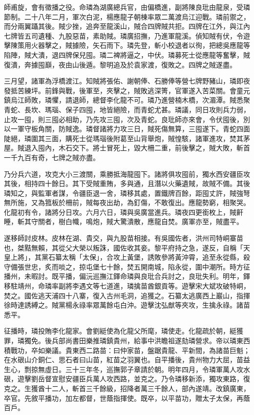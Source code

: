 \begin{pinyinscope}
師甫旋，會有徵播之役。命璘為湖廣總兵官，由偏橋進，副將陳良玭由龍泉，受璘節制。二十八年二月，軍次白泥，楊應龍子朝棟率眾二萬渡烏江迎戰。璘前禦之，而分兩翼躡其後。賊少挫，追奔至龍溪山，賊合四牌賊共拒。四牌在江外，與江內七牌皆五司遺種、九股惡苗，素助賊。璘廣招撫，乃進軍龍溪。偵知賊有伏，令遊擊陳策用火器擊之，賊據險，矢石雨下。璘先登，斬小校退者以徇，把總吳應龍等陷陣，賊大潰，退四牌保兒囤。璘二裨將逼之，中伏。璘募死士從應龍等奮擊，賊復潰，奔據囤巔，夜由山後遁。黎明追及於袁家渡，復敗之。四牌之賊遂盡。

三月望，諸軍為浮橋渡江。知賊將張佑、謝朝俸、石勝俸等營七牌野豬山，璘即夜發抵苦練坪。前鋒與戰，後軍至，夾擊之，賊敗逃深箐，官軍遂入苦菜關。會童元鎮烏江師敗，璘懼，請退師，總督李化龍不可。璘乃進營楠木橋，次湄潭。賊悉聚青蛇、長坎、瑪瑙、保子四囤，地皆絕險，而青蛇尤甚。璘議，同日攻則兵力弱，止攻一囤，則三囤必相助，乃先攻三囤，次及青蛇。良玭師亦來會，令伏囤後，別以一軍守板角關，防賊逸。璘督諸將力攻三日，賊死傷無算，三囤遂下。青蛇四面陡絕，璘圍其三面，購死士從瑪瑙後附葛至山背舉炮，賊惶駭，諸軍進攻，焚其茅屋。賊退入囤內，木石交下。將士冒死上，毀大柵二重，前後擊之，賊大敗，斬首一千九百有奇，七牌之賊亦盡。

乃分兵六道，攻克大小三渡關，乘勝抵海龍囤下。諸將俱攻囤前，獨水西安疆臣攻其後，相持四十餘日。其下受賊重賄，多與通，且潛以火藥遺賊，故賊不備。其後璘知之，與監軍者謀，令疆臣退一舍，璘移其處，置鐵牌百餘，距囤丈許，賊強弩無所施，又為箛板於柵前，賊每夜出劫，為釘傷，不敢復出。應龍勢窮，相聚哭。化龍初有令，諸將分日攻。六月六日，璘與吳廣當進兵。璘夜四更銜枚上，賊鼾睡，斬其守關者，樹白幟，鳴炮，賊大驚潰散，應龍自焚。廣軍亦至，賊盡平。

遂移師討皮林。皮林在湖、貴交，與九股苗相接。有吳國佐者，洪州司特峒寨苗也，桀黠無賴，其從父大榮以叛誅，國佐收其妾。黎平府持之急，遂反，自稱「天皇上將」，其黨石纂太稱「太保」，合攻上黃堡，誘敗參將黃沖霄，追至永從縣，殺守備張世忠，炙而啖之，掠屯堡七十餘，焚五開南城，陷永從，圍中潮所。時方征播州，未暇討。既平播，偏沅巡撫江鐸命璘與良玭合兵討之，良玭失利。明年，鐸移駐靖州，命璘率副將李遇文等七道進，璘擒苗酋銀貢等。遊擊宋大斌攻破特峒，焚之。國佐逃天浦四十八寨，復入古州毛洞，追獲之。石纂太逃廣西上巖山，指揮徐時達誘縛之。賊黨楊永祿率眾萬餘屯白沖。遊擊沈弘猷等夾攻，生擒永祿。諸苗悉平。

征播時，璘投賄李化龍家。會劉綎使為化龍父所麾，璘使走。化龍疏於朝，綎獲罪，璘獨免。後兵部尚書田樂推璘鎮貴州，給事中洪瞻祖遂劾璘營求。帝以璘東西積戰功，卒如樂議。貴東西二路苗：曰仲家苗，盤踞貴龍、平新間，為諸苗巨魁；在水硍山介銅仁、思石者曰山苗，紅苗之羽翼也。自平播後，貴州物力大屈，苗益生心，剽掠無虛日。三十三年冬，巡撫郭子章請於朝。明年四月，令璘軍萬人攻水硍，遊擊劉岳督宣慰安疆臣兵萬人攻西路，並克之。乃令璘移新添，獨攻東路，復克之。生獲酋十二人，斬首三千餘級，招降者萬三千餘人，部內遂靖。改鎮廣東，卒官。先敘平播功，加左都督，世蔭指揮使。既卒，以平苗功，贈太子太保，再蔭百戶。


\end{pinyinscope}
